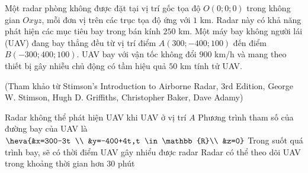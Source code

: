 \begin{ex}%
	 Một radar phòng không được đặt tại vị trí gốc tọa độ $O(0;0;0)$ trong không gian $Oxyz$, mỗi đơn vị trên các trục tọa độ ứng với $1$ km. Radar này có khả năng phát hiện các mục tiêu bay trong bán kính $250$ km. Một máy bay không người lái (UAV) đang bay thẳng đều từ vị trí điểm $A(300;-400;100)$ đến điểm $B(-300;400;100)$. UAV bay với vận tốc không đổi $900$ km/h và mang theo thiết bị gây nhiễu chủ động có tầm hiệu quả $50$ km tính tử UAV.
	\begin{flushright}
		(Tham khảo từ  Stimson's Introduction to Airborne Radar, $3$rd Edition,
		 George W. Stimson, Hugh D. Griffiths, Christopher Baker, Dave Adamy)
	\end{flushright}
	 \choiceTF
		{\True Radar không thể phát hiện UAV khi UAV ở vị trí  $A$}
		{Phương trình tham số của đường bay của  UAV là $\heva{&x=300-3t \\ &y=-400+4t,t \in \mathbb{R}\\ &z=0}$}
		{Trong suốt quá trình bay, sẽ có thời điểm UAV gây nhiểu được  radar}
		{\True Radar có thể theo dõi UAV trong khoảng thời gian hơn  $30$ phút}
\end{ex}
